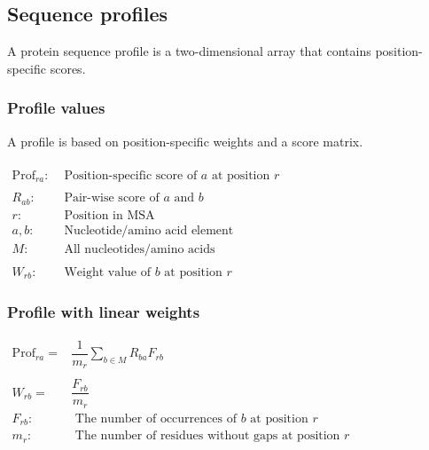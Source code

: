 %
%

%
%
\subsection{Sequence profiles}
A protein sequence profile is a two-dimensional array that contains position-specific scores.

%
%
\subsubsection*{Profile values}
A profile is based on position-specific weights and a score matrix. \\ \\

$\begin{aligned}
\mathrm{Prof}_{ra} :& \text{ Position-specific score of } a \text{ at position } r \\ \\
R_{ab} :& \text{ Pair-wise score of } a \text{ and } b \\
r :& \text{ Position in MSA}  \\
a, b :& \text{ Nucleotide/amino acid element}  \\
M :& \text{ All nucleotides/amino acids}  \\ \\
W_{rb} :& \text{ Weight value of }  b \text{ at position } r 
\end{aligned} $

%
%
\subsubsection*{Profile with linear weights}

\bigskip 

$\begin{aligned}
\mathrm{Prof}_{ra} =& \dfrac{1}{m_r} \sum_{b \in M}{} R_{ba} F_{rb} \\ \\
W_{rb} =& \dfrac{F_{rb}}{m_{r}} \\
F_{rb} :& \text{ The number of occurrences of } b \text{ at position }  r \\
m_{r} :& \text{ The number of residues without gaps at position } r 
\end{aligned} $


